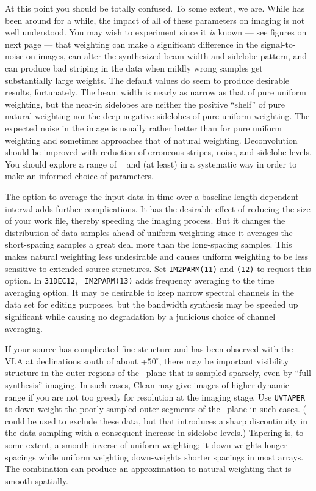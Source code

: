      At this point you should be totally confused.  To some extent, we
are.  While {\tt {}} has been around for a while, the impact
of all of these parameters on imaging is not well understood.  You may
wish to experiment since it {\it is\/} known --- see figures on next
page --- that weighting can make a significant difference in the
signal-to-noise on images, can alter the synthesized beam width and
sidelobe pattern, and can produce bad striping in the data when mildly
wrong samples get substantially large weights.  The default values do
seem to produce desirable results, fortunately.  The beam width is
nearly as narrow as that of pure uniform weighting, but the near-in
sidelobes are neither the positive ``shelf'' of pure natural weighting
nor the deep negative sidelobes of pure uniform weighting.  The
expected noise in the image is usually rather better than for pure
uniform weighting and sometimes approaches that of natural weighting.
Deconvolution should be improved with reduction of erroneous stripes,
noise, and sidelobe levels.  You should explore a range of {\tt
{}} and {\tt {}} (at least) in a systematic way
in order to make an informed choice of parameters.

     The option to average the input data in time over a
baseline-length dependent interval adds further complications.  It has
the desirable effect of reducing the size of your work file, thereby
speeding the imaging process.  But it changes the distribution of data
samples ahead of uniform weighting since it averages the short-spacing
samples a great deal more than the long-spacing samples.  This makes
natural weighting less undesirable and causes uniform weighting to be
less sensitive to extended source structures.  Set {\tt IM2PARM(11)}
and {\tt (12)} to request this option.  In {\tt 31DEC12}, {\tt
IM2PARM(13)} adds frequency averaging to the time averaging option.
It may be desirable to keep narrow spectral channels in the data set
for editing purposes, but the bandwidth synthesis may be speeded up
significant while causing no degradation by a judicious choice of
channel averaging.

     If your source has complicated fine structure and has been
observed with the VLA at declinations south of about +$50^{\circ}$,
there may be important visibility structure in the outer regions of
the \uv\ plane that is sampled sparsely, even by ``full synthesis''
imaging.  In such cases, Clean may give images of higher dynamic range
if you are not too greedy for resolution at the imaging stage.  Use
{\tt UVTAPER} to down-weight the poorly sampled outer segments of the
\uv\ plane in such cases.  ({\tt {}} could be used to
exclude these data, but that introduces a sharp discontinuity in the
data sampling with a consequent increase in sidelobe levels.)
Tapering is, to some extent, a smooth inverse of uniform weighting; it
down-weights longer spacings while uniform weighting down-weights
shorter spacings in most arrays.  The combination can produce an
approximation to natural weighting that is smooth spatially.

